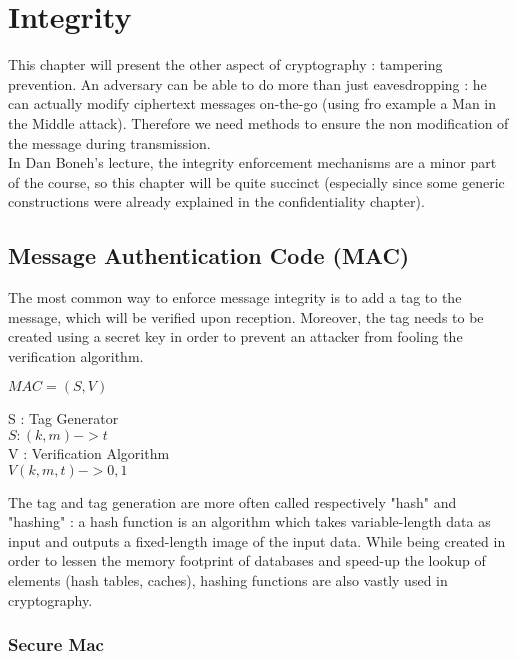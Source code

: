 \chapter{Integrity}


This chapter will present the other aspect of cryptography : tampering prevention. An adversary can be able to do more than just eavesdropping : he can actually modify ciphertext messages on-the-go (using fro example a Man in the Middle attack). Therefore we need methods to ensure the non modification of the message during transmission.\\
In Dan Boneh's lecture, the integrity enforcement mechanisms are a minor part of the course, so this chapter will be quite succinct (especially since some generic constructions were already explained in the confidentiality chapter).


\section{Message Authentication Code (MAC)}

The most common way to enforce message integrity is to add a tag to the message, which will be verified upon reception. Moreover, the tag needs to be created using a secret key in order to prevent an attacker from fooling the verification algorithm.

\begin{mydef} $MAC = (S,V)$  
\begin{flushright}
\begin{minipage}[t]{0.8\textwidth}
\indent   	S : Tag Generator \\
\indent     $S: (k,m) -> t$   \\
\indent	V : Verification Algorithm \\
\indent    $V(k,m,t) -> {0,1}$ \\
\end{minipage}
\end{flushright}
\end{mydef}

The tag and tag generation are more often called respectively "hash" and "hashing"  : a hash function is an algorithm which takes variable-length data as input and outputs a fixed-length image of the input data. While being created in order to lessen the memory footprint of databases and speed-up the lookup of elements (hash tables, caches), hashing functions are also vastly used in cryptography. 
 
\subsection{Secure Mac}


